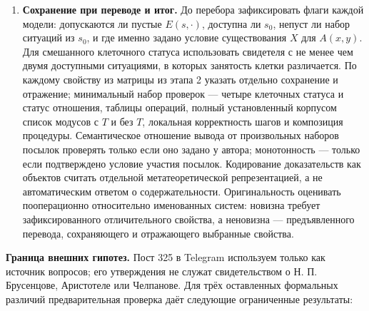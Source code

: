 \documentclass[12pt,a4paper]{article}
\begin{document}
\begin{enumerate}
\item \textbf{Сохранение при переводе и итог.} До перебора зафиксировать флаги каждой модели: допускаются ли пустые \(E(s,\cdot)\), доступна ли \(s_0\), непуст ли набор ситуаций из \(s_0\), и где именно задано условие существования \(X\) для \(A(x,y)\). Для смешанного клеточного статуса использовать свидетеля с не менее чем двумя доступными ситуациями, в которых занятость клетки различается. По каждому свойству из матрицы из этапа 2 указать отдельно сохранение и отражение; минимальный набор проверок — четыре клеточных статуса и статус отношения, таблицы операций, полный установленный корпусом список модусов с \(T\) и без \(T\), локальная корректность шагов и композиция процедуры. Семантическое отношение вывода от произвольных наборов посылок проверять только если оно задано у автора; монотонность — только если подтверждено условие участия посылок. Кодирование доказательств как объектов считать отдельной метатеоретической репрезентацией, а не автоматическим ответом о содержательности. Оригинальность оценивать пооперационно относительно именованных систем: новизна требует зафиксированного отличительного свойства, а неновизна — предъявленного перевода, сохраняющего и отражающего выбранные свойства.
\end{enumerate}

\textbf{Граница внешних гипотез.} Пост 325 в Telegram используем только как источник вопросов; его утверждения не служат свидетельством о Н. П. Брусенцове, Аристотеле или Челпанове. Для трёх оставленных формальных различий предварительная проверка даёт следующие ограниченные результаты:
\end{document}
